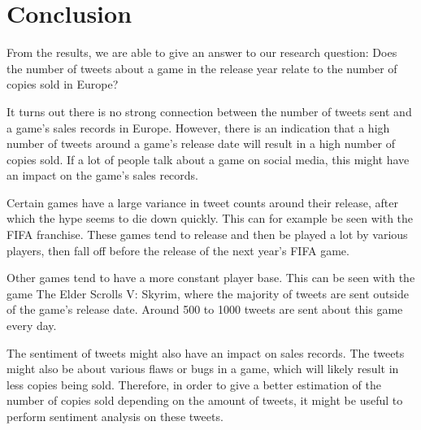 \section{Conclusion}
From the results, we are able to give an answer to our research question: Does the number of tweets about a game in the release year relate to the number of copies sold in Europe?

It turns out there is no strong connection between the number of tweets sent and a game's sales records in Europe. However, there is an indication that a high number of tweets around a game's release date will result in a high number of copies sold. If a lot of people talk about a game on social media, this might have an impact on the game's sales records.  

Certain games have a large variance in tweet counts around their release, after which the hype seems to die down quickly. This can for example be seen with the FIFA franchise. These games tend to release and then be played a lot by various players, then fall off before the release of the next year's FIFA game. 

Other games tend to have a more constant player base. This can be seen with the game The Elder Scrolls V: Skyrim, where the majority of tweets are sent outside of the game's release date. Around 500 to 1000 tweets are sent about this game every day.

The sentiment of tweets might also have an impact on sales records. The tweets might also be about various flaws or bugs in a game, which will likely result in less copies being sold. Therefore, in order to give a better estimation of the number of copies sold depending on the amount of tweets, it might be useful to perform sentiment analysis on these tweets.